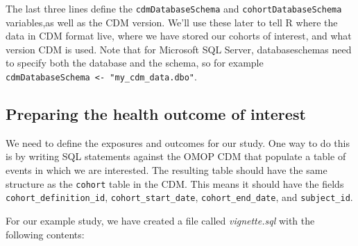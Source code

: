 \documentclass[
]{article}
\begin{document}
The last three lines define the \texttt{cdmDatabaseSchema} and
\texttt{cohortDatabaseSchema} variables,as well as the CDM version.
We'll use these later to tell R where the data in CDM format live, where
we have stored our cohorts of interest, and what version CDM is used.
Note that for Microsoft SQL Server, databaseschemas need to specify both
the database and the schema, so for example
\texttt{cdmDatabaseSchema\ \textless{}-\ "my\_cdm\_data.dbo"}.

\hypertarget{preparing-the-health-outcome-of-interest}{%
\subsection{Preparing the health outcome of
interest}\label{preparing-the-health-outcome-of-interest}}

We need to define the exposures and outcomes for our study. One way to
do this is by writing SQL statements against the OMOP CDM that populate
a table of events in which we are interested. The resulting table should
have the same structure as the \texttt{cohort} table in the CDM. This
means it should have the fields \texttt{cohort\_definition\_id},
\texttt{cohort\_start\_date}, \texttt{cohort\_end\_date}, and
\texttt{subject\_id}.

For our example study, we have created a file called \emph{vignette.sql}
with the following contents:
\end{document}
